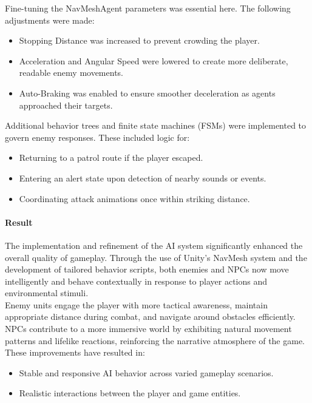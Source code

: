 \documentclass{article}
\begin{document}
Fine-tuning the NavMeshAgent parameters was essential here. The following adjustments were made:
\begin{itemize}
    \item Stopping Distance was increased to prevent crowding the player.
    \item Acceleration and Angular Speed were lowered to create more deliberate, readable enemy movements.
    \item Auto-Braking was enabled to ensure smoother deceleration as agents approached their targets.
\end{itemize}

Additional behavior trees and finite state machines (FSMs) were implemented to govern enemy responses. These included logic for:
\begin{itemize}
    \item Returning to a patrol route if the player escaped.
    \item Entering an alert state upon detection of nearby sounds or events.
    \item Coordinating attack animations once within striking distance.
\end{itemize}

\paragraph{Result}\hfill

The implementation and refinement of the AI system significantly enhanced the overall quality of gameplay. Through the use of Unity's NavMesh system and the development of tailored behavior scripts, both enemies and NPCs now move intelligently and behave contextually in response to player actions and environmental stimuli.\\

Enemy units engage the player with more tactical awareness, maintain appropriate distance during combat, and navigate around obstacles efficiently. NPCs contribute to a more immersive world by exhibiting natural movement patterns and lifelike reactions, reinforcing the narrative atmosphere of the game.\\

These improvements have resulted in:
\begin{itemize}
    \item Stable and responsive AI behavior across varied gameplay scenarios.
    \item Realistic interactions between the player and game entities.    
\end{itemize}
\end{document}
